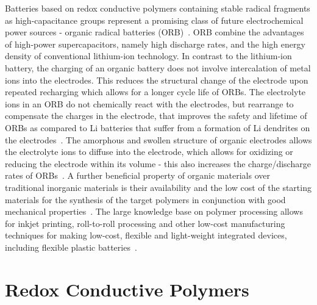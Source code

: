 Batteries based on redox conductive polymers containing stable radical fragments as high-capacitance groups represent a promising class of future electrochemical power sources - organic radical batteries (ORB)~\cite{nakahara2002_cpl, nishide2004_electact,xie2021_mathoriz,Rohland_2021}. ORB combine the advantages of high-power supercapacitors, namely high discharge rates, and the high energy density of conventional lithium-ion technology. In contrast to the lithium-ion battery, the charging of an organic battery does not involve intercalation of metal ions into the electrodes. This reduces the structural change of the electrode upon repeated recharging which allows for a longer cycle life of ORBs. The electrolyte ions in an ORB do not chemically react with the electrodes, but rearrange to compensate the charges in the electrode, that improves the safety and lifetime of ORBs as compared to Li batteries that suffer from a formation of Li dendrites on the electrodes~\cite{Nitta2015}. The amorphous and swollen structure of organic electrodes allows the electrolyte ions to diffuse into the electrode, which allows for oxidizing or reducing the electrode within its volume - this also increases the charge/discharge rates of ORBs~\cite{nishide_2009}. A further beneficial property of organic materials over traditional inorganic materials is their availability and the low cost of the starting materials for the synthesis of the target polymers in conjunction with good mechanical properties~\cite{janoschka2012_advmater, muench2016_chemrev, friebe2017_topcurrchem}. The large knowledge base on polymer processing allows for inkjet printing, roll-to-roll processing and other low-cost manufacturing techniques for making low-cost, flexible and light-weight integrated devices, including flexible plastic batteries~\cite{janoschka2012_advmater,nishide_2009}. 



\section{Redox Conductive Polymers}

